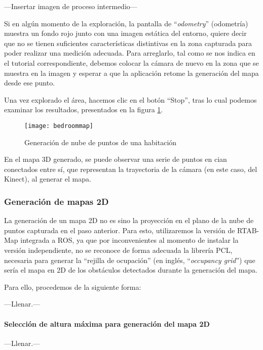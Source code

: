 ---Insertar imagen de proceso intermedio---

Si en algún momento de la exploración, la pantalla de ``\textit{odometry}'' (odometría) muestra un fondo rojo junto con una imagen estática del entorno, quiere decir que no se tienen suficientes características distintivas en la zona capturada para poder realizar una medición adecuada. Para arreglarlo, tal como se nos indica en el tutorial correspondiente, debemos colocar la cámara de nuevo en la zona que se muestra en la imagen y esperar a que la aplicación retome la generación del mapa desde ese punto.

Una vez explorado el área, hacemos clic en el botón ``Stop'', tras lo cual podemos examinar los resultados, presentados en la figura \ref{figure:bedroommap}.

\begin{figure}[hb]
\centering
\texttt{[image: bedroommap]}
\caption{Generación de nube de puntos de una habitación}
\label{figure:bedroommap}
\end{figure}

En el mapa 3D generado, se puede observar una serie de puntos en cian conectados entre sí, que representan la trayectoria de la cámara (en este caso, del Kinect), al generar el mapa.

\subsubsection{Generación de mapas 2D}

La generación de un mapa 2D no es sino la proyección en el plano de la nube de puntos capturada en el paso anterior. Para esto, utilizaremos la versión de RTAB-Map integrada a ROS, ya que por inconvenientes al momento de instalar la versión independiente, no se reconoce de forma adecuada la librería PCL, necesaria para generar la ``rejilla de ocupación'' (en inglés, ``\textit{occupancy grid}'') que sería el mapa en 2D de los obstáculos detectados durante la generación del mapa.

Para ello, procedemos de la siguiente forma:

---Llenar.---

\paragraph{Selección de altura máxima para generación del mapa 2D}

---Llenar.---